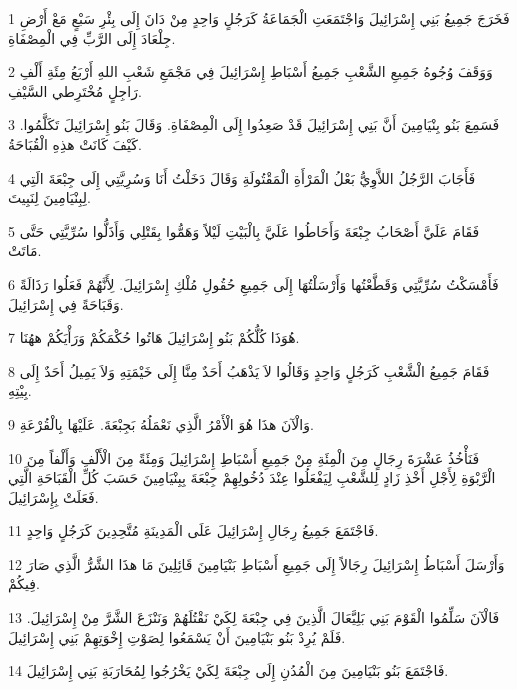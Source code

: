 \par 1 فَخَرَجَ جَمِيعُ بَنِي إِسْرَائِيلَ وَاجْتَمَعَتِ الْجَمَاعَةُ كَرَجُلٍ وَاحِدٍ مِنْ دَانَ إِلَى بِئْرِ سَبْعٍ مَعْ أَرْضِ جِلْعَادَ إِلَى الرَّبِّ فِي الْمِصْفَاةِ.
\par 2 وَوَقَفَ وُجُوهُ جَمِيعِ الشَّعْبِ جَمِيعُ أَسْبَاطِ إِسْرَائِيلَ فِي مَجْمَعِ شَعْبِ اللهِ أَرْبَعُ مِئَةِ أَلْفِ رَاجِلٍ مُخْتَرِطي السَّيْفِ.
\par 3 فَسَمِعَ بَنُو بِنْيَامِينَ أَنَّ بَنِي إِسْرَائِيلَ قَدْ صَعِدُوا إِلَى الْمِصْفَاةِ. وَقَالَ بَنُو إِسْرَائِيلَ تَكَلَّمُوا. كَيْفَ كَانَتْ هذِهِ الْقُبَاحَةُ.
\par 4 فَأَجَابَ الرَّجُلُ اللاَّوِيُّ بَعْلُ الْمَرْأَةِ الْمَقْتُولَةِ وَقَالَ دَخَلْتُ أَنَا وَسُرِيَّتِي إِلَى جِبْعَةَ الَتِي لِبِنْيَامِينَ لِنَبِيتَ.
\par 5 فَقَامَ عَلَيَّ أَصْحَابُ جِبْعَةَ وَأَحَاطُوا عَلَيَّ بِالْبَيْتِ لَيْلاً وَهَمُّوا بِقَتْلِي وَأَذَلُّوا سُرِّيَّتِي حَتَّى مَاتَتْ.
\par 6 فَأَمْسَكْتُ سُرِّيَّتِي وَقَطَّعْتُها وَأَرْسَلْتُهَا إِلَى جَمِيعِ حُقُولِ مُلْكِ إِسْرَائِيلَ. لِأَنَّهُمْ فَعَلُوا رَذَالَةً وَقَبَاحَةً فِي إِسْرَائِيلَ.
\par 7 هُوَذَا كُلُّكُمْ بَنُو إِسْرَائِيلَ هَاتُوا حُكْمَكُمْ وَرَأْيَكُمْ ههُنَا.
\par 8 فَقَامَ جَمِيعُ الْشَّعْبِ كَرَجُلٍ وَاحِدٍ وَقَالُوا لاَ يَذْهَبُ أَحَدٌ مِنَّا إِلَى خَيْمَتِهِ وَلاَ يَمِيلُ أَحَدٌ إِلَى بِيْتِهِ.
\par 9 وَالْآنَ هذَا هُوَ الْأَمْرُ الَّذِي نَعْمَلُهُ بَجِبْعَةَ. عَلَيْهَا بِالْقُرْعَةِ.
\par 10 فَنَأْخُذُ عَشْرَةَ رِجَالٍ مِنَ الْمِئَةِ مِنْ جَمِيعِ أَسْبَاطِ إِسْرَائِيلَ وَمِئَةً مِنَ الْأَلْفِ وَأَلْفاً مِنَ الْرَّبْوَةِ لِأَجْلِ أَخْذِ زَادٍ لِلشَّعْبِ لِيَفْعَلُوا عِنْدَ دُخُولِهِمْ جِبْعَةَ بِبِنْيَامِينَ حَسَبَ كُلِّ الْقَبَاحَةِ الَّتِي فَعَلَتْ بِإِسْرَائِيلَ.
\par 11 فَاجْتَمَعَ جَمِيعُ رِجَالِ إِسْرَائِيلَ عَلَى الْمَدِينَةِ مُتَّحِدِينَ كَرَجُلٍ وَاحِدٍ.
\par 12 وَأَرْسَلَ أَسْبَاطُ إِسْرَائِيلَ رِجَالاً إِلَى جَمِيعِ أَسْبَاطِ بَنْيَامِينَ قَائِلِينَ مَا هذَا الشَّرُّ الَّذِي صَارَ فِيكُمْ.
\par 13 فَالْآنَ سَلِّمُوا الْقَوْمَ بَنِي بَلِيَّعَالَ الَّذِينَ فِي جِبْعَةَ لِكَيْ نَقْتُلَهُمْ وَنَنْزَعَ الشَّرَّ مِنْ إِسْرَائِيلَ. فَلَمْ يُرِدْ بَنُو بَنْيَامِينَ أَنْ يَسْمَعُوا لِصَوْتِ إِخْوَتِهِمْ بَنِي إِسْرَائِيلَ.
\par 14 فَاجْتَمَعَ بَنُو بَنْيَامِينَ مِنَ الْمُدُنِ إِلَى جِبْعَةَ لِكَيْ يَخْرُجُوا لِمُحَارَبَةِ بَنِي إِسْرَائِيلَ.
